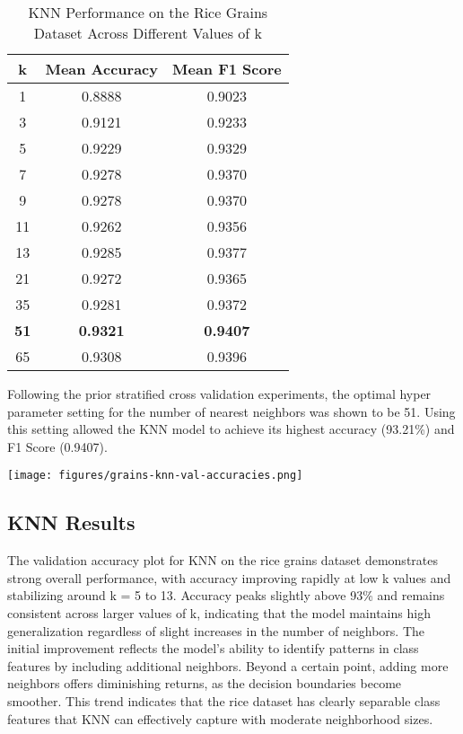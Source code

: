 \documentclass[letterpaper]{article}
\begin{document}
\begin{table}[h]
\centering
\begin{tabular}{|c|c|c|}
\hline
\textbf{k} & \textbf{Mean Accuracy} & \textbf{Mean F1 Score} \\
\hline
1   & 0.8888 & 0.9023 \\
3   & 0.9121 & 0.9233 \\
5   & 0.9229 & 0.9329 \\
7   & 0.9278 & 0.9370 \\
9   & 0.9278 & 0.9370 \\
11  & 0.9262 & 0.9356 \\
13  & 0.9285 & 0.9377 \\
21  & 0.9272 & 0.9365 \\
35  & 0.9281 & 0.9372 \\
\textbf{51}  & \textbf{0.9321} & \textbf{0.9407} \\
65  & 0.9308 & 0.9396 \\
\hline
\end{tabular}
\caption{KNN Performance on the Rice Grains Dataset Across Different Values of k}
\label{tab:knn_rice_results}
\end{table}

Following the prior stratified cross validation experiments, the optimal hyper parameter setting for the number of nearest neighbors was shown to be 51. Using this setting allowed the KNN model to achieve its highest accuracy (93.21\%) and F1 Score (0.9407).


\vspace{0.2in}
    \begin{minipage}{\linewidth}
        \centering
        \texttt{[image: figures/grains-knn-val-accuracies.png]}
    \end{minipage}
\vspace{0.1in}

\subsection*{KNN Results}

The validation accuracy plot for KNN on the rice grains dataset demonstrates strong overall performance, with accuracy improving rapidly at low k values and stabilizing around k = 5 to 13. Accuracy peaks slightly above 93\% and remains consistent across larger values of k, indicating that the model maintains high generalization regardless of slight increases in the number of neighbors. The initial improvement reflects the model's ability to identify patterns in class features by including additional neighbors. Beyond a certain point, adding more neighbors offers diminishing returns, as the decision boundaries become smoother. This trend indicates that the rice dataset has clearly separable class features that KNN can effectively capture with moderate neighborhood sizes.
\end{document}
